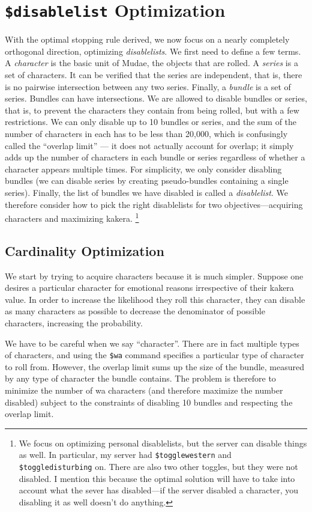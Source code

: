 \documentclass[11pt, oneside]{article}
\theoremstyle{plain}
\theoremstyle{definition}
\begin{document}
\section{\texttt{\$disablelist} Optimization}
With the optimal stopping rule derived, we now focus on a nearly completely
orthogonal direction, optimizing \textit{disablelists}. We first need to define
a few terms. A \textit{character} is the basic unit of Mudae, the objects that
are rolled. A \textit{series} is a set of characters. It can be verified that
the series are independent, that is, there is no pairwise intersection between
any two series. Finally, a \textit{bundle} is a set of series. Bundles can have
intersections. We are allowed to disable bundles or series, that is, to prevent
the characters they contain from being rolled, but with a few restrictions.
We can only disable up to 10 bundles or series, and the sum of the number of
characters in each has to be less than 20,000, which is confusingly called
the \enquote{overlap limit} --- it does not actually account for overlap; it
simply adds up the number of characters in each bundle or series regardless of
whether a character appears multiple times. For simplicity, we only consider
disabling bundles (we can disable series by creating pseudo-bundles containing
a single series). Finally, the list of bundles we have disabled is called a
\textit{disablelist}. We therefore consider how to pick the right disablelists
for two objectives---acquiring characters and maximizing kakera.
\footnote{ We focus on optimizing personal disablelists, but the server can
disable things as well. In particular, my server had \texttt{\$togglewestern}
and \texttt{\$toggledisturbing} on. There are also two other toggles, but
they were not disabled. I mention this because the optimal solution will have
to take into account what the sever has disabled---if the server disabled a
character, you disabling it as well doesn't do anything.}

\subsection{Cardinality Optimization}
We start by trying to acquire characters because it is much simpler. Suppose
one desires a particular character for emotional reasons irrespective of their
kakera value. In order to increase the likelihood they roll this character,
they can disable as many characters as possible to decrease the denominator
of possible characters, increasing the probability.

We have to be careful when we say \enquote{character}. There are in fact
multiple types of characters, and using the \texttt{\$wa} command specifies
a particular type of character to roll from. However, the overlap limit sums
up the size of the bundle, measured by any type of character the bundle
contains. The problem is therefore to minimize the number of wa characters
(and therefore maximize the number disabled) subject to the constraints of
disabling 10 bundles and respecting the overlap limit.
\end{document}
